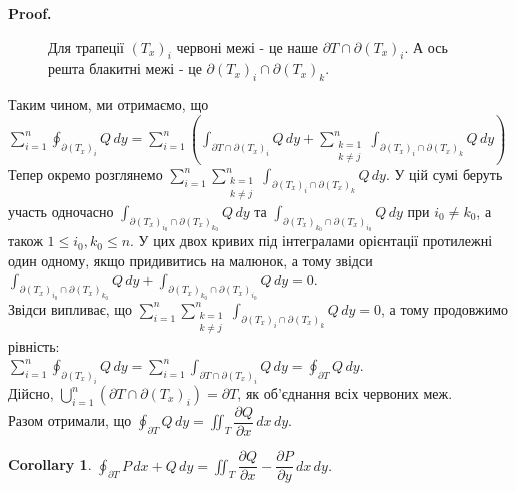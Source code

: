 \documentclass[a4paper, 10pt]{article}
\makeatletter
\def\departial#1#2{\dfrac{\partial {#1}}{\partial {#2}}}
\def\qed{$\blacksquare$}
\theoremstyle{theoremdd}
\theoremstyle{theoremdd}
\theoremstyle{theoremdd}
\theoremstyle{theoremdd}
\theoremstyle{theoremdd}
\theoremstyle{theoremdd}
\theoremstyle{theoremdd}
\theoremstyle{theoremdd}
\theoremstyle{theoremdd}
\theoremstyle{theoremdd}
\theoremstyle{theoremdd}
\theoremstyle{theoremdd}
\theoremstyle{theoremdd}
\theoremstyle{theoremdd}
\newtheorem{corollary}[theorem]{Corollary}
\theoremstyle{theoremdd}
\renewenvironment{proof}[1][Proof.\\]{\par
\pushQED{\hfill \qed}%
\normalfont \topsep6\p@\@plus6\p@\relax
\trivlist
\item\relax
{\bfseries
#1\@addpunct{.}}\hspace\labelsep\ignorespaces
}{%
\popQED\endtrivlist\@endpefalse
}
\makeatother
\begin{document}
\begin{proof}
\begin{figure}[H]
\caption*{Для трапеції $(T_x)_i$ червоні межі - це наше $\partial T \cap \partial (T_x)_i$. А ось решта блакитні межі - це $\partial (T_x)_i \cap \partial (T_x)_k$.}
\end{figure}
Таким чином, ми отримаємо, що\\
$\displaystyle\sum_{i=1}^n \oint_{\partial (T_x)_i} Q\,dy = \sum_{i=1}^n \left( \int_{\partial T \cap \partial (T_x)_i} Q\,dy + \sum_{\substack{k=1 \\ k \neq j}}^n \int_{\partial (T_x)_i \cap \partial (T_x)_k} Q\,dy \right)$\\
Тепер окремо розглянемо $\displaystyle\sum_{i=1}^n \sum_{\substack{k=1 \\ k \neq j}}^n \int_{\partial (T_x)_i \cap \partial (T_x)_k} Q\,dy$. У цій сумі беруть участь одночасно $\displaystyle\int_{\partial(T_x)_{i_0} \cap \partial(T_x)_{k_0}} Q\,dy$ та $\displaystyle\int_{\partial(T_x)_{k_0} \cap \partial(T_x)_{i_0}} Q\,dy$ при $i_0 \neq k_0$, а також $1 \leq i_0,k_0 \leq n$. У цих двох кривих під інтегралами орієнтації протилежні один одному, якщо придивитись на малюнок, а тому звідси\\
$\displaystyle\int_{\partial(T_x)_{i_0} \cap \partial(T_x)_{k_0}} Q\,dy + \int_{\partial(T_x)_{k_0} \cap \partial(T_x)_{i_0}} Q\,dy = 0$.\\
Звідси випливає, що $\displaystyle\sum_{i=1}^n \sum_{\substack{k=1 \\ k \neq j}}^n \int_{\partial (T_x)_i \cap \partial (T_x)_k} Q\,dy = 0$, а тому продовжимо рівність:\\
$\displaystyle\sum_{i=1}^n \oint_{\partial (T_x)_i} Q\,dy = \sum_{i=1}^n \int_{\partial T \cap \partial (T_x)_i} Q\,dy = \oint_{\partial T} Q\,dy$.\\
Дійсно, $\displaystyle\bigcup_{i=1}^n (\partial T \cap \partial (T_x)_i) = \partial T$, як об'єднання всіх червоних меж.\\
Разом отримали, що $\displaystyle\oint_{\partial T}Q\,dy = \iint_T \departial{Q}{x}\,dx\,dy$.
\end{proof}

\begin{corollary}
$\displaystyle\oint_{\partial T} P\,dx + Q\,dy = \iint_T \departial{Q}{x} - \departial{P}{y}\,dx\,dy$.
\end{corollary}
\end{document}
